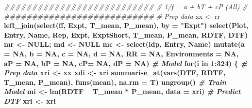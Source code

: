 \documentclass[
]{article}
\newenvironment{Shaded}{\begin{snugshade}}{\end{snugshade}}
\newcommand{\CommentTok}[1]{\textcolor[rgb]{0.56,0.35,0.01}{\textit{#1}}}
\newcommand{\ControlFlowTok}[1]{\textcolor[rgb]{0.13,0.29,0.53}{\textbf{#1}}}
\newcommand{\DataTypeTok}[1]{\textcolor[rgb]{0.13,0.29,0.53}{#1}}
\newcommand{\DecValTok}[1]{\textcolor[rgb]{0.00,0.00,0.81}{#1}}
\newcommand{\KeywordTok}[1]{\textcolor[rgb]{0.13,0.29,0.53}{\textbf{#1}}}
\newcommand{\NormalTok}[1]{#1}
\newcommand{\OperatorTok}[1]{\textcolor[rgb]{0.81,0.36,0.00}{\textbf{#1}}}
\newcommand{\OtherTok}[1]{\textcolor[rgb]{0.56,0.35,0.01}{#1}}
\newcommand{\StringTok}[1]{\textcolor[rgb]{0.31,0.60,0.02}{#1}}
\begin{document}
\begin{Shaded}
\begin{Highlighting}[]
\CommentTok{###########################}
\CommentTok{# 1/f = a + bT + cP (All) #}
\CommentTok{###########################}
\CommentTok{# Prep data}
\NormalTok{xx <-}\StringTok{ }\NormalTok{rr }\OperatorTok{%
\StringTok{  }\KeywordTok{left_join}\NormalTok{(}\KeywordTok{select}\NormalTok{(ff, Expt, T_mean, P_mean), }\DataTypeTok{by =} \StringTok{"Expt"}\NormalTok{) }\OperatorTok{%
\StringTok{  }\KeywordTok{select}\NormalTok{(Plot, Entry, Name, Rep, Expt, ExptShort, T_mean, P_mean, RDTF, DTF)}
\NormalTok{mr <-}\StringTok{ }\OtherTok{NULL}\NormalTok{; md <-}\StringTok{ }\OtherTok{NULL}
\NormalTok{mc <-}\StringTok{ }\KeywordTok{select}\NormalTok{(ldp, Entry, Name) }\OperatorTok{%
\StringTok{  }\KeywordTok{mutate}\NormalTok{(}\DataTypeTok{a =} \OtherTok{NA}\NormalTok{, }\DataTypeTok{b =} \OtherTok{NA}\NormalTok{, }\DataTypeTok{c =} \OtherTok{NA}\NormalTok{, }\DataTypeTok{d =} \OtherTok{NA}\NormalTok{, }\DataTypeTok{RR =} \OtherTok{NA}\NormalTok{, }\DataTypeTok{Environments =} \OtherTok{NA}\NormalTok{,}
         \DataTypeTok{aP =} \OtherTok{NA}\NormalTok{, }\DataTypeTok{bP =} \OtherTok{NA}\NormalTok{, }\DataTypeTok{cP=} \OtherTok{NA}\NormalTok{, }\DataTypeTok{dP =} \OtherTok{NA}\NormalTok{)}
\CommentTok{# Model}
\ControlFlowTok{for}\NormalTok{(i }\ControlFlowTok{in} \DecValTok{1}\OperatorTok{:}\DecValTok{324}\NormalTok{) \{}
  \CommentTok{# Prep data}
\NormalTok{  xri <-}\StringTok{ }\NormalTok{xx }\OperatorTok{%
\NormalTok{  xdi <-}\StringTok{ }\NormalTok{xri }\OperatorTok{%
\StringTok{    }\KeywordTok{summarise_at}\NormalTok{(}\KeywordTok{vars}\NormalTok{(DTF, RDTF, T_mean, P_mean), }\KeywordTok{funs}\NormalTok{(mean), }\DataTypeTok{na.rm =}\NormalTok{ T) }\OperatorTok{%
\StringTok{    }\KeywordTok{ungroup}\NormalTok{()}
  \CommentTok{# Train Model}
\NormalTok{  mi <-}\StringTok{ }\KeywordTok{lm}\NormalTok{(RDTF }\OperatorTok{~}\StringTok{ }\NormalTok{T_mean }\OperatorTok{*}\StringTok{ }\NormalTok{P_mean, }\DataTypeTok{data =}\NormalTok{ xri)}
  \CommentTok{# Predict DTF}
\NormalTok{  xri <-}\StringTok{ }\NormalTok{xri }\OperatorTok{%
}}}}}}}
\end{Highlighting}
\end{Shaded}
\end{document}
